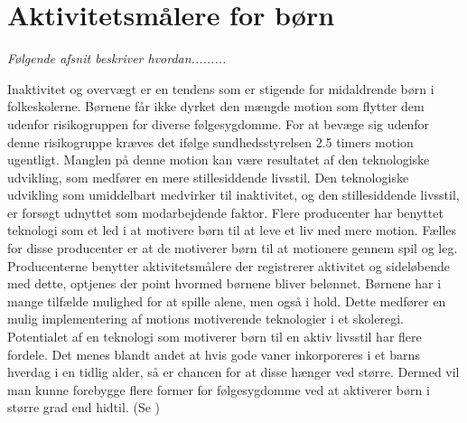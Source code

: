 \newpage
\section{Aktivitetsmålere for børn} \label{tracker_intro}
\textit{Følgende afsnit beskriver hvordan......... }

Inaktivitet og overvægt er en tendens som er stigende for midaldrende børn i folkeskolerne. Børnene får ikke dyrket den mængde motion som flytter dem udenfor risikogruppen for diverse følgesygdomme. For at bevæge sig udenfor denne risikogruppe kræves det ifølge sundhedsstyrelsen 2.5 timers motion ugentligt. Manglen på denne motion kan være resultatet af den teknologiske udvikling, som medfører en mere stillesiddende livsstil. \citep{ObesityActionCoalition}  \newline 
Den teknologiske udvikling som umiddelbart medvirker til inaktivitet, og den stillesiddende livsstil, er forsøgt udnyttet som modarbejdende faktor. Flere producenter har benyttet teknologi som et led i at motivere børn til at leve et liv med mere motion. Fælles for disse producenter er at de motiverer børn til at motionere gennem spil og leg. Producenterne benytter aktivitetsmålere der registrerer aktivitet og sideløbende med dette, optjenes der point hvormed børnene bliver belønnet. Børnene har i mange tilfælde mulighed for at spille alene, men også i hold. Dette medfører en mulig implementering af motions motiverende teknologier i et skoleregi. \newline
Potentialet af en teknologi som motiverer børn til en aktiv livsstil har flere fordele. Det menes blandt andet at hvis gode vaner inkorporeres i et barns hverdag i en tidlig alder, så er chancen for at disse hænger ved større. Dermed vil man kunne forebygge flere former for følgesygdomme ved at aktiverer børn i større grad end hidtil. (Se )

